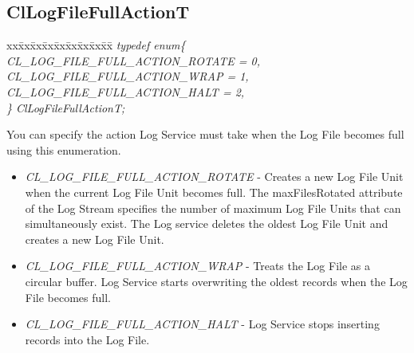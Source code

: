 \begin{flushleft}
\subsection{ClLogFileFullActionT}
\begin{tabbing}
xx\=xx\=xx\=xx\=xx\=xx\=xx\=xx\=xx\=\kill
\textit{typedef enum\{}\\
\>\>\>\>\textit{CL\_LOG\_FILE\_FULL\_ACTION\_ROTATE = 0,}\\
\>\>\>\>\textit{CL\_LOG\_FILE\_FULL\_ACTION\_WRAP = 1,}\\
\>\>\>\>\textit{CL\_LOG\_FILE\_FULL\_ACTION\_HALT = 2,}\\
\textit{\} ClLogFileFullActionT;}\end{tabbing}
You can specify the action Log Service must take when the Log File becomes full using this enumeration. 
\begin{itemize}
\item \textit{CL\_\-LOG\_\-FILE\_\-FULL\_\-ACTION\_\-ROTATE} - Creates a new Log File Unit when the current Log File Unit 
becomes full. The maxFilesRotated attribute of the Log Stream specifies the number of maximum Log File Units that can simultaneously exist.
The Log service deletes the oldest Log File Unit and creates a new Log File Unit.
\item
\textit{CL\_\-LOG\_\-FILE\_\-FULL\_\-ACTION\_\-WRAP} - Treats the Log File as a circular buffer. Log Service starts overwriting the oldest records
when the Log File becomes full.
\item	\textit{CL\_\-LOG\_\-FILE\_\-FULL\_\-ACTION\_\-HALT} - Log Service stops inserting records into the
Log File.
\end{itemize}





\end{flushleft}
